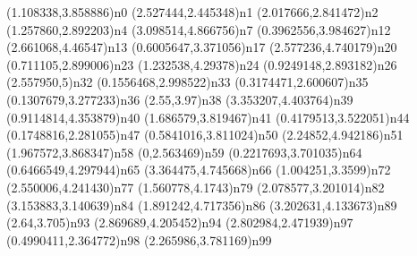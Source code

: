 \dotnode[](1.108338,3.858886){n0}
\dotnode[](2.527444,2.445348){n1}
\dotnode[](2.017666,2.841472){n2}
\dotnode[](1.257860,2.892203){n4}
\dotnode[](3.098514,4.866756){n7}
\dotnode[](0.3962556,3.984627){n12}
\dotnode[](2.661068,4.46547){n13}
\dotnode[](0.6005647,3.371056){n17}
\dotnode[](2.577236,4.740179){n20}
\dotnode[](0.711105,2.899006){n23}
\dotnode[](1.232538,4.29378){n24}
\dotnode[](0.9249148,2.893182){n26}
\dotnode[](2.557950,5){n32}
\dotnode[](0.1556468,2.998522){n33}
\dotnode[](0.3174471,2.600607){n35}
\dotnode[](0.1307679,3.277233){n36}
\dotnode[](2.55,3.97){n38}
\dotnode[](3.353207,4.403764){n39}
\dotnode[](0.9114814,4.353879){n40}
\dotnode[](1.686579,3.819467){n41}
\dotnode[](0.4179513,3.522051){n44}
\dotnode[](0.1748816,2.281055){n47}
\dotnode[](0.5841016,3.811024){n50}
\dotnode[](2.24852,4.942186){n51}
\dotnode[](1.967572,3.868347){n58}
\dotnode[](0,2.563469){n59}
\dotnode[](0.2217693,3.701035){n64}
\dotnode[](0.6466549,4.297944){n65}
\dotnode[](3.364475,4.745668){n66}
\dotnode[](1.004251,3.3599){n72}
\dotnode[](2.550006,4.241430){n77}
\dotnode[](1.560778,4.1743){n79}
\dotnode[](2.078577,3.201014){n82}
\dotnode[](3.153883,3.140639){n84}
\dotnode[](1.891242,4.717356){n86}
\dotnode[](3.202631,4.133673){n89}
\dotnode[](2.64,3.705){n93}
\dotnode[](2.869689,4.205452){n94}
\dotnode[](2.802984,2.471939){n97}
\dotnode[](0.4990411,2.364772){n98}
\dotnode[](2.265986,3.781169){n99}
